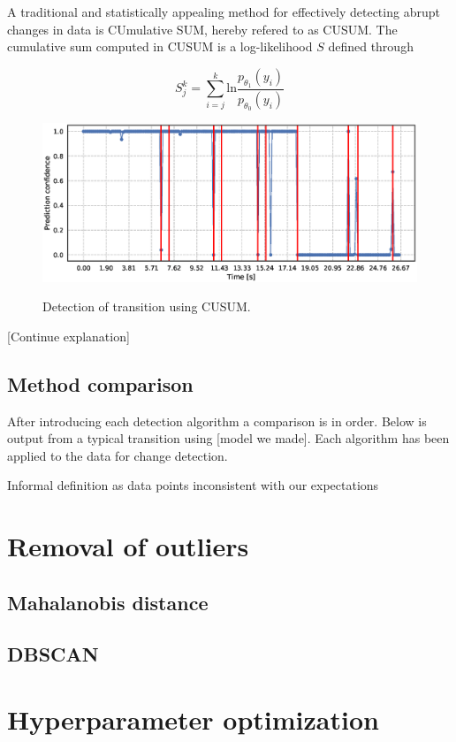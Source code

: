 A traditional and statistically appealing method for effectively detecting abrupt changes in data is CUmulative SUM, hereby refered to as CUSUM. The cumulative sum computed in CUSUM is a log-likelihood $S$ defined through

\begin{equation}
	S_j^k = \sum_{i=j}^k \text{ln}\frac{p_{\theta_1}(y_i)}{p_{\theta_0}(y_i)}
\end{equation}

\begin{figure}
	\includegraphics[scale=0.5]{figs_temp/detect_cusum}
	\label{fig:detect_cusum}
	\caption{Detection of transition using CUSUM.}
\end{figure}

[Continue explanation]






\subsection{Method comparison}

After introducing each detection algorithm a comparison is in order. Below is output from a typical transition using [model we made]. Each algorithm has been applied to the data for change detection.


Informal definition as data points inconsistent with our expectations

\section{Removal of outliers}


\subsection{Mahalanobis distance}

\subsection{DBSCAN}

\section{Hyperparameter optimization}
\fi


